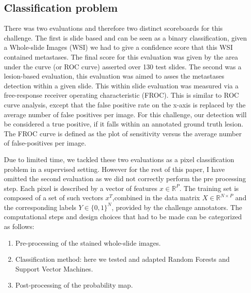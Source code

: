 \documentclass[a4paper,10pt]{article}
\begin{document}
\subsection{Classification problem}
There was two evaluations and therefore two distinct scoreboards for this challenge. The first is slide based and can be seen as a binary classification, given a Whole-slide Images (WSI) we had to give a confidence score that this WSI contained metastases. The final score for this evaluation was given by the area under the curve (or ROC curve) asserted over 130 test slides. The second was a lesion-based evaluation, this evaluation was aimed to asses the metastases detection within a given slide. This within slide evaluation was measured via a free-response receiver operating characteristic (FROC). This is similar to ROC curve analysis, except that the false positive rate on the x-axis is replaced by the average number of false positives per image. For this challenge, our detection will be considered a true positive, if it falls within an annotated ground truth lesion. The FROC curve is defined as the plot of sensitivity versus the average number of false-positives per image. 

Due to limited time, we tackled these two evaluations as a pixel classification problem in a supervised setting. However for the rest of this paper, I have omitted the second evaluation as we did not correctly perform the pre processing step. Each pixel is described by a vector of features $x \in \mathbb{R}^P$. The training set is composed of a set of such vectors $x^T$,combined in the data matrix $X \in \mathbb{R}^{N \times P}$ and the corresponding labels $Y \in \{0,1\}^N$, provided by the challenge annotators. 
The computational steps and design choices that had to be made can be categorized as follows: 
\begin{enumerate}
	\item Pre-processing of the stained whole-slide images.
         \item Classification method: here we tested and adapted
           Random Forests and Support Vector Machines. 
         \item Post-processing of the probability map.
\end{enumerate}
\end{document}
